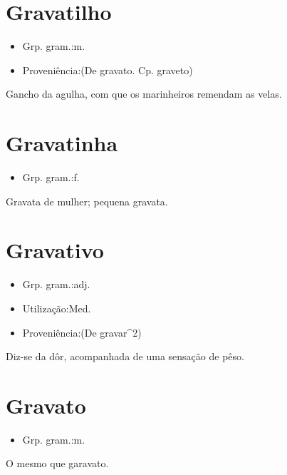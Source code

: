 \section{Gravatilho}
\begin{itemize}
\item {Grp. gram.:m.}
\end{itemize}
\begin{itemize}
\item {Proveniência:(De \textunderscore gravato\textunderscore . Cp. \textunderscore graveto\textunderscore )}
\end{itemize}
Gancho da agulha, com que os marinheiros remendam as velas.
\section{Gravatinha}
\begin{itemize}
\item {Grp. gram.:f.}
\end{itemize}
Gravata de mulher; pequena gravata.
\section{Gravativo}
\begin{itemize}
\item {Grp. gram.:adj.}
\end{itemize}
\begin{itemize}
\item {Utilização:Med.}
\end{itemize}
\begin{itemize}
\item {Proveniência:(De \textunderscore gravar\textunderscore ^2)}
\end{itemize}
Diz-se da dôr, acompanhada de uma sensação de pêso.
\section{Gravato}
\begin{itemize}
\item {Grp. gram.:m.}
\end{itemize}
O mesmo que \textunderscore garavato\textunderscore .
